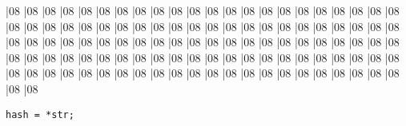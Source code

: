 \begin{slide*}
\begin{barenv}
\bar{0}{8}
\bar{0}{8}
\bar{0}{8}
\bar{0}{8}
\bar{0}{8}
\bar{0}{8}
\bar{0}{8}
\bar{0}{8}
\bar{0}{8}
\bar{0}{8}
\bar{0}{8}
\bar{0}{8}
\bar{0}{8}
\bar{0}{8}
\bar{0}{8}
\bar{0}{8}
\bar{0}{8}
\bar{0}{8}
\bar{0}{8}
\bar{0}{8}
\bar{0}{8}
\bar{0}{8}
\bar{0}{8}
\bar{0}{8}
\bar{0}{8}
\bar{0}{8}
\bar{0}{8}
\bar{0}{8}
\bar{0}{8}
\bar{0}{8}
\bar{0}{8}
\bar{0}{8}
\bar{0}{8}
\bar{0}{8}
\bar{0}{8}
\bar{0}{8}
\bar{0}{8}
\bar{0}{8}
\bar{0}{8}
\bar{0}{8}
\bar{0}{8}
\bar{0}{8}
\bar{0}{8}
\bar{0}{8}
\bar{0}{8}
\bar{0}{8}
\bar{0}{8}
\bar{0}{8}
\bar{0}{8}
\bar{0}{8}
\bar{0}{8}
\bar{0}{8}
\bar{0}{8}
\bar{0}{8}
\bar{0}{8}
\bar{0}{8}
\bar{0}{8}
\bar{0}{8}
\bar{0}{8}
\bar{0}{8}
\bar{0}{8}
\bar{0}{8}
\bar{0}{8}
\bar{0}{8}
\bar{0}{8}
\bar{0}{8}
\bar{0}{8}
\bar{0}{8}
\bar{0}{8}
\bar{0}{8}
\bar{0}{8}
\bar{0}{8}
\bar{0}{8}
\bar{0}{8}
\bar{0}{8}
\bar{0}{8}
\bar{0}{8}
\bar{0}{8}
\bar{0}{8}
\bar{0}{8}
\bar{0}{8}
\bar{0}{8}
\bar{0}{8}
\bar{0}{8}
\bar{0}{8}
\bar{0}{8}
\bar{0}{8}
\bar{0}{8}
\bar{0}{8}
\bar{0}{8}
\bar{0}{8}
\bar{0}{8}
\bar{0}{8}
\bar{0}{8}
\bar{0}{8}
\bar{0}{8}
\bar{0}{8}
\bar{0}{8}
\bar{0}{8}
\bar{0}{8}
\bar{0}{8}
\bar{0}{8}
\bar{0}{8}
\bar{0}{8}
\bar{0}{8}
\bar{0}{8}
\bar{0}{8}
\bar{0}{8}
\bar{0}{8}
\bar{0}{8}
\bar{0}{8}
\bar{0}{8}
\end{barenv}
\mbox{}\hfil{\scriptsize \verb"hash = *str;"}\hfil
\vfil
\end{slide*}

